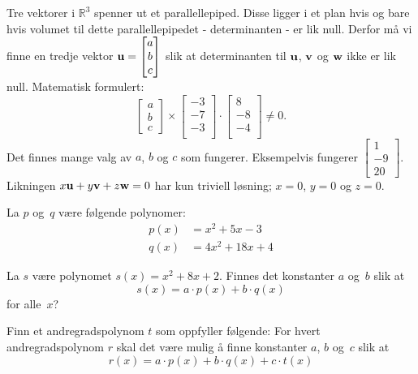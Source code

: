 \begin{losning}
Tre vektorer i $\mathbb{R}^3$ spenner ut et parallellepiped. Disse ligger i et plan hvis og bare hvis volumet til dette parallellepipedet - determinanten - er lik null. Derfor må vi finne en tredje vektor $\mathbf{u}=\begin{bmatrix}
a\\
b\\
c
\end{bmatrix}$ slik at determinanten til $\mathbf{u}$, $\mathbf{v}$ og $\mathbf{w}$ ikke er lik null. Matematisk formulert: $$\begin{bmatrix}
a\\
b\\
c
\end{bmatrix} \times \begin{bmatrix}
-3  \\
-7 \\
-3 \\
\end{bmatrix}\cdot \begin{bmatrix}
8  \\
-8 \\
-4 \\
\end{bmatrix}\neq 0.$$ Det finnes mange valg av $a$, $b$ og $c$ som fungerer. Eksempelvis fungerer $\begin{bmatrix}
1\\
-9\\
20
\end{bmatrix}$. Likningen $x\mathbf{u}+y\mathbf{v}+z\mathbf{w}=0$ har kun triviell løsning; $x=0$, $y=0$ og $z=0$.

\end{losning}



\begin{oppgave}
La $p$ og~$q$ være følgende polynomer:
\begin{align*}
p(x) &= x^2 + 5x - 3 \\
q(x) &= 4x^2 + 18x + 4
\end{align*}

\begin{punkt}
La $s$ være polynomet $s(x) = x^2 + 8x + 2$.  Finnes det konstanter
$a$ og~$b$ slik at
\[
s(x) = a \cdot p(x) + b \cdot q(x)
\]
for alle~$x$?
\end{punkt}

\begin{punkt}
Finn et andregradspolynom $t$ som oppfyller følgende: For hvert
andregradspolynom $r$ skal det være mulig å finne konstanter $a$, $b$
og~$c$ slik at
\[
r(x) = a \cdot p(x) + b \cdot q(x) + c \cdot t(x)
\]
\end{punkt}

\end{oppgave}

